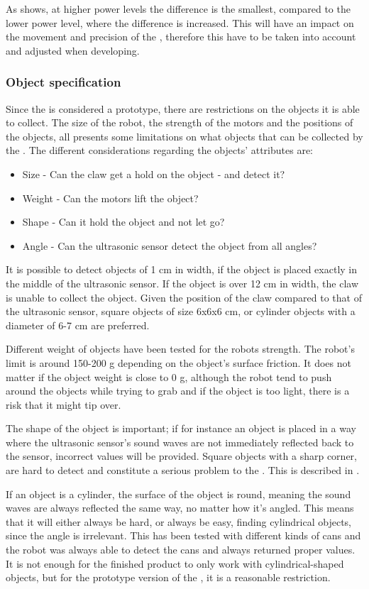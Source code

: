 As  shows, at higher power levels the difference is the smallest, compared to the lower power level, where the difference is increased. This will have an impact on the movement and precision of the \projname{}, therefore this have to be taken into account and adjusted when developing. 

\subsubsection{Object specification} \label{sec:object_specification}
Since the \projname{} is considered a prototype, there are restrictions on the objects it is able to collect. The size of the robot, the strength of the motors and the positions of the objects, all presents some limitations on what objects that can be collected by the \projname{}. The different considerations regarding the objects' attributes are:

\begin{itemize}
\item Size - Can the claw get a hold on the object - and detect it? 
\item Weight - Can the motors lift the object? 
\item Shape - Can it hold the object and not let go?
\item Angle - Can the ultrasonic sensor detect the object from all angles?
\end{itemize}

It is possible to detect objects of 1 cm in width, if the object is placed exactly in the middle of the ultrasonic sensor. If the object is over 12 cm in width, the claw is unable to collect the object. Given the position of the claw compared to that of the ultrasonic sensor, square objects of size 6x6x6 cm, or cylinder objects with a diameter of 6-7 cm are preferred.

Different weight of objects have been tested for the robots strength. The robot's limit is around 150-200 g depending on the object's surface friction. It does not matter if the object weight is close to 0 g, although the robot tend to push around the objects while trying to grab and if the object is too light, there is a risk that it might tip over.

The shape of the object is important; if for instance an object is placed in a way where the ultrasonic sensor's sound waves are not immediately reflected back to the sensor, incorrect values will be provided. Square objects with a sharp corner, are hard to detect and constitute a serious problem to the \projname{}. This is described in . 

If an object is a cylinder, the surface of the object is round, meaning the sound waves are always reflected the same way, no matter how it's angled. This means that it will either always be hard, or always be easy, finding cylindrical objects, since the angle is irrelevant. This has been tested with different kinds of cans and the robot was always able to detect the cans and always returned proper values. It is not enough for the finished product to only work with cylindrical-shaped objects, but for the prototype version of the \projname{}, it is a reasonable restriction.

